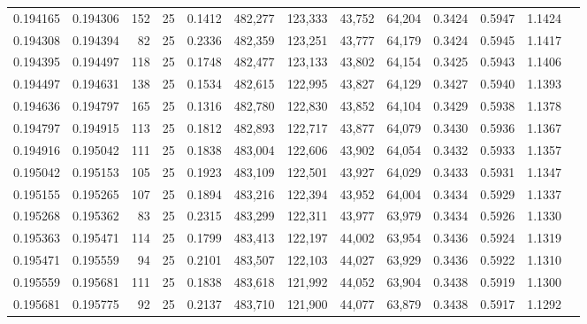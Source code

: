 \begin{tabular}{rrrrrrrrrrrrr}
0.194165 & 0.194306 &   152 &  25 &                                     0.1412 & 482,277 & 123,333 &  43,752 &  64,204 & 0.3424 & 0.5947 & 1.1424 \\
0.194308 & 0.194394 &    82 &  25 &                                     0.2336 & 482,359 & 123,251 &  43,777 &  64,179 & 0.3424 & 0.5945 & 1.1417 \\
0.194395 & 0.194497 &   118 &  25 &                                     0.1748 & 482,477 & 123,133 &  43,802 &  64,154 & 0.3425 & 0.5943 & 1.1406 \\
0.194497 & 0.194631 &   138 &  25 &                                     0.1534 & 482,615 & 122,995 &  43,827 &  64,129 & 0.3427 & 0.5940 & 1.1393 \\
0.194636 & 0.194797 &   165 &  25 &                                     0.1316 & 482,780 & 122,830 &  43,852 &  64,104 & 0.3429 & 0.5938 & 1.1378 \\
0.194797 & 0.194915 &   113 &  25 &                                     0.1812 & 482,893 & 122,717 &  43,877 &  64,079 & 0.3430 & 0.5936 & 1.1367 \\
0.194916 & 0.195042 &   111 &  25 &                                     0.1838 & 483,004 & 122,606 &  43,902 &  64,054 & 0.3432 & 0.5933 & 1.1357 \\
0.195042 & 0.195153 &   105 &  25 &                                     0.1923 & 483,109 & 122,501 &  43,927 &  64,029 & 0.3433 & 0.5931 & 1.1347 \\
0.195155 & 0.195265 &   107 &  25 &                                     0.1894 & 483,216 & 122,394 &  43,952 &  64,004 & 0.3434 & 0.5929 & 1.1337 \\
0.195268 & 0.195362 &    83 &  25 &                                     0.2315 & 483,299 & 122,311 &  43,977 &  63,979 & 0.3434 & 0.5926 & 1.1330 \\
0.195363 & 0.195471 &   114 &  25 &                                     0.1799 & 483,413 & 122,197 &  44,002 &  63,954 & 0.3436 & 0.5924 & 1.1319 \\
0.195471 & 0.195559 &    94 &  25 &                                     0.2101 & 483,507 & 122,103 &  44,027 &  63,929 & 0.3436 & 0.5922 & 1.1310 \\
0.195559 & 0.195681 &   111 &  25 &                                     0.1838 & 483,618 & 121,992 &  44,052 &  63,904 & 0.3438 & 0.5919 & 1.1300 \\
0.195681 & 0.195775 &    92 &  25 &                                     0.2137 & 483,710 & 121,900 &  44,077 &  63,879 & 0.3438 & 0.5917 & 1.1292 \\

\end{tabular}
